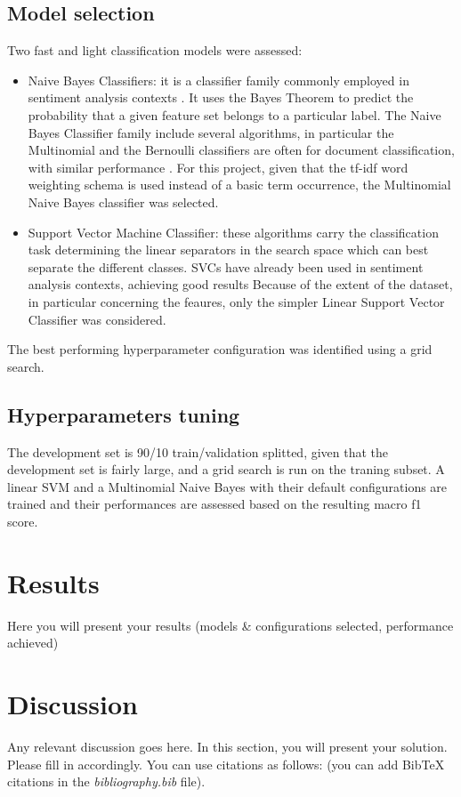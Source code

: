 \documentclass[conference]{IEEEtran}
\begin{document}
\subsection{Model selection}
Two fast and light classification models were assessed: 
\begin{itemize}
    \item Naive Bayes Classifiers: it is a classifier family commonly employed in sentiment analysis contexts \cite{MEDHAT20141093}. It uses the Bayes Theorem to predict the probability that a given feature set belongs to a particular label. The Naive Bayes Classifier family include several algorithms, in particular the Multinomial and the Bernoulli classifiers are often for document classification, with similar performance \cite{8776800}. For this project, given that the tf-idf word weighting schema is used instead of a basic term occurrence, the Multinomial Naive Bayes classifier was selected. 
    \item Support Vector Machine Classifier: these algorithms carry the classification task determining the linear separators in the search space which can best separate the different classes. SVCs have already been used in sentiment analysis contexts, achieving good results \cite{6914200} Because of the extent of the dataset, in particular concerning the feaures, only the simpler Linear Support Vector Classifier was considered. 
\end{itemize}
The best performing hyperparameter configuration was identified using a grid search.
\subsection{Hyperparameters tuning}
The development set is 90/10 train/validation splitted, given that the development set is fairly large, and a grid search is run on the traning subset. A linear SVM and a Multinomial Naive Bayes with their default configurations are trained and their performances are assessed based on the resulting macro f1 score.
\section{Results}
Here you will present your results (models \& configurations selected, performance achieved)

\section{Discussion}
Any relevant discussion goes here.
In this section, you will present your solution. Please fill in accordingly.
You can use citations as follows: \cite{goodfellow2016deep} (you can add BibTeX citations in the \textit{bibliography.bib} file).



\end{document}
